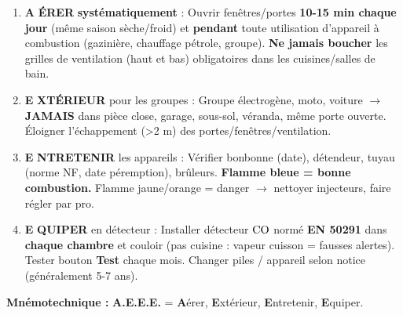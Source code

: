 \documentclass[11pt]{article}
\begin{document}
\begin{methode}
\begin{enumerate}
    \item \textbf{A} \textbf{ÉRER} \textbf{systématiquement} : Ouvrir fenêtres/portes \textbf{10-15 min chaque jour} (même saison sèche/froid) et \textbf{pendant} toute utilisation d'appareil à combustion (gazinière, chauffage pétrole, groupe). \textbf{Ne jamais boucher} les grilles de ventilation (haut et bas) obligatoires dans les cuisines/salles de bain.
    \item \textbf{E} \textbf{XTÉRIEUR} pour les groupes : Groupe électrogène, moto, voiture $\to$ \textbf{JAMAIS} dans pièce close, garage, sous-sol, véranda, même porte ouverte. Éloigner l'échappement (\textgreater 2 m) des portes/fenêtres/ventilation.
    \item \textbf{E} \textbf{NTRETENIR} les appareils : Vérifier bonbonne (date), détendeur, tuyau (norme NF, date péremption), brûleurs. \textbf{Flamme bleue = bonne combustion.} Flamme jaune/orange = danger $\to$ nettoyer injecteurs, faire régler par pro.
    \item \textbf{E} \textbf{QUIPER} en détecteur : Installer détecteur $\ce{CO}$ normé \textbf{EN 50291} dans \textbf{chaque chambre} et couloir (pas cuisine : vapeur cuisson = fausses alertes). Tester bouton \textbf{Test} chaque mois. Changer piles / appareil selon notice (généralement 5-7 ans).
\end{enumerate}
\textbf{Mnémotechnique :} \textbf{A.E.E.E.} = \textbf{A}érer, \textbf{E}xtérieur, \textbf{E}ntretenir, \textbf{E}quiper.
\end{methode}
\end{document}
